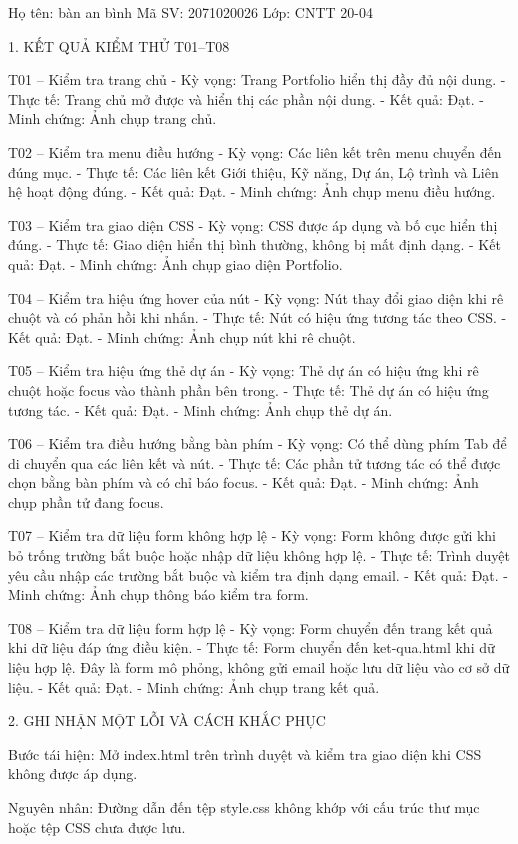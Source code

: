 Họ tên: bàn an bình 
Mã SV: 2071020026
Lớp: CNTT 20-04

1. KẾT QUẢ KIỂM THỬ T01–T08

T01 – Kiểm tra trang chủ
- Kỳ vọng: Trang Portfolio hiển thị đầy đủ nội dung.
- Thực tế: Trang chủ mở được và hiển thị các phần nội dung.
- Kết quả: Đạt.
- Minh chứng: Ảnh chụp trang chủ.

T02 – Kiểm tra menu điều hướng
- Kỳ vọng: Các liên kết trên menu chuyển đến đúng mục.
- Thực tế: Các liên kết Giới thiệu, Kỹ năng, Dự án, Lộ trình và Liên hệ hoạt động đúng.
- Kết quả: Đạt.
- Minh chứng: Ảnh chụp menu điều hướng.

T03 – Kiểm tra giao diện CSS
- Kỳ vọng: CSS được áp dụng và bố cục hiển thị đúng.
- Thực tế: Giao diện hiển thị bình thường, không bị mất định dạng.
- Kết quả: Đạt.
- Minh chứng: Ảnh chụp giao diện Portfolio.

T04 – Kiểm tra hiệu ứng hover của nút
- Kỳ vọng: Nút thay đổi giao diện khi rê chuột và có phản hồi khi nhấn.
- Thực tế: Nút có hiệu ứng tương tác theo CSS.
- Kết quả: Đạt.
- Minh chứng: Ảnh chụp nút khi rê chuột.

T05 – Kiểm tra hiệu ứng thẻ dự án
- Kỳ vọng: Thẻ dự án có hiệu ứng khi rê chuột hoặc focus vào thành phần bên trong.
- Thực tế: Thẻ dự án có hiệu ứng tương tác.
- Kết quả: Đạt.
- Minh chứng: Ảnh chụp thẻ dự án.

T06 – Kiểm tra điều hướng bằng bàn phím
- Kỳ vọng: Có thể dùng phím Tab để di chuyển qua các liên kết và nút.
- Thực tế: Các phần tử tương tác có thể được chọn bằng bàn phím và có chỉ báo focus.
- Kết quả: Đạt.
- Minh chứng: Ảnh chụp phần tử đang focus.

T07 – Kiểm tra dữ liệu form không hợp lệ
- Kỳ vọng: Form không được gửi khi bỏ trống trường bắt buộc hoặc nhập dữ liệu không hợp lệ.
- Thực tế: Trình duyệt yêu cầu nhập các trường bắt buộc và kiểm tra định dạng email.
- Kết quả: Đạt.
- Minh chứng: Ảnh chụp thông báo kiểm tra form.

T08 – Kiểm tra dữ liệu form hợp lệ
- Kỳ vọng: Form chuyển đến trang kết quả khi dữ liệu đáp ứng điều kiện.
- Thực tế: Form chuyển đến ket-qua.html khi dữ liệu hợp lệ. Đây là form mô phỏng, không gửi email hoặc lưu dữ liệu vào cơ sở dữ liệu.
- Kết quả: Đạt.
- Minh chứng: Ảnh chụp trang kết quả.

2. GHI NHẬN MỘT LỖI VÀ CÁCH KHẮC PHỤC

Bước tái hiện: Mở index.html trên trình duyệt và kiểm tra giao diện khi CSS không được áp dụng.

Nguyên nhân: Đường dẫn đến tệp style.css không khớp với cấu trúc thư mục hoặc tệp CSS chưa được lưu.

